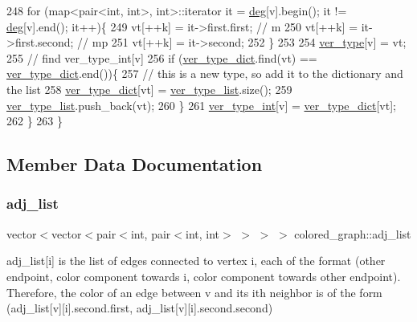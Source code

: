 \begin{DoxyCode}
248     \textcolor{keywordflow}{for} (map<pair<int, int>, \textcolor{keywordtype}{int}>::iterator it = \hyperlink{classcolored__graph_ae3269d35c1b022bc70d195bebd4e1b8a}{deg}[v].begin(); it != \hyperlink{classcolored__graph_ae3269d35c1b022bc70d195bebd4e1b8a}{deg}[v].end(); it++)\{
249       vt[++k] = it->first.first; \textcolor{comment}{// m}
250       vt[++k] = it->first.second; \textcolor{comment}{// mp}
251       vt[++k] = it->second;
252     \}
253 
254     \hyperlink{classcolored__graph_a2cc32e7146fa3319f83cfa940f5e1be4}{ver\_type}[v] = vt;
255     \textcolor{comment}{// find ver\_type\_int[v]}
256     \textcolor{keywordflow}{if} (\hyperlink{classcolored__graph_aeb780762429ddac375799f4a45405712}{ver\_type\_dict}.find(vt) == \hyperlink{classcolored__graph_aeb780762429ddac375799f4a45405712}{ver\_type\_dict}.end())\{
257       \textcolor{comment}{// this is a new type, so add it to the dictionary and the list }
258       \hyperlink{classcolored__graph_aeb780762429ddac375799f4a45405712}{ver\_type\_dict}[vt] = \hyperlink{classcolored__graph_a3a1ae8abac458d20a2afb4aa48bbc956}{ver\_type\_list}.size();
259       \hyperlink{classcolored__graph_a3a1ae8abac458d20a2afb4aa48bbc956}{ver\_type\_list}.push\_back(vt);
260     \}
261     \hyperlink{classcolored__graph_a491ed2ea1a65118af02ec606c8d44c0a}{ver\_type\_int}[v] = \hyperlink{classcolored__graph_aeb780762429ddac375799f4a45405712}{ver\_type\_dict}[vt];
262   \}
263 \}
\end{DoxyCode}


\subsection{Member Data Documentation}
\mbox{\label{classcolored__graph_a45dce16965079286cf3f41a54a1b2ea4}} 
\subsubsection{\texorpdfstring{adj\+\_\+list}{adj\_list}}
{\footnotesize\ttfamily vector$<$vector$<$pair$<$int, pair$<$int, int$>$ $>$ $>$ $>$ colored\+\_\+graph\+::adj\+\_\+list}



adj\+\_\+list\mbox{[}i\mbox{]} is the list of edges connected to vertex i, each of the format (other endpoint, color component towards i, color component towards other endpoint). Therefore, the color of an edge between v and its ith neighbor is of the form (adj\+\_\+list\mbox{[}v\mbox{]}\mbox{[}i\mbox{]}.second.\+first, adj\+\_\+list\mbox{[}v\mbox{]}\mbox{[}i\mbox{]}.second.\+second) 

